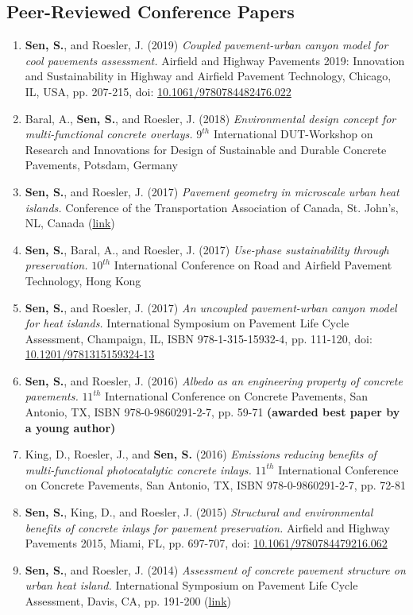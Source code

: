 \documentclass[12pt]{article}
\begin{document}
\subsection*{Peer-Reviewed Conference Papers}
\begin{enumerate}[label=(C\arabic*)]
	\item \textbf{Sen, S.}, and Roesler, J. (2019) \textit{Coupled pavement-urban canyon model for cool pavements assessment.} Airfield and Highway Pavements 2019: Innovation and Sustainability in Highway and Airfield Pavement Technology, Chicago, IL, USA, pp. 207-215, doi: \href{http://dx.doi.org/10.1061/9780784482476.022}{10.1061/9780784482476.022}
	\item Baral, A., \textbf{Sen, S.}, and Roesler, J. (2018) \textit{Environmental design concept for multi-functional concrete overlays.} $9^{th}$ International DUT-Workshop on Research and Innovations for Design of Sustainable and Durable Concrete Pavements, Potsdam, Germany
	\item \textbf{Sen, S.}, and Roesler, J. (2017) \textit{Pavement geometry in microscale urban heat islands.} Conference of the Transportation Association of Canada, St. John’s, NL, Canada (\href{http://www.tac-atc.ca/sites/default/files/conf_papers/sens_-_pavement_geometry_in_microscale_urban_heat_islands.pdf}{link})
	\item \textbf{Sen, S.}, Baral, A., and Roesler, J. (2017) \textit{Use-phase sustainability through preservation.} $10^{th}$ International Conference on Road and Airfield Pavement Technology, Hong Kong
	\item \textbf{Sen, S.}, and Roesler, J. (2017) \textit{An uncoupled pavement-urban canyon model for heat islands.} International Symposium on Pavement Life Cycle Assessment, Champaign, IL, ISBN 978-1-315-15932-4, pp. 111-120, doi: \href{http://dx.doi.org/10.1201/9781315159324-13}{10.1201/9781315159324-13}
	\item \textbf{Sen, S.}, and Roesler, J. (2016) \textit{Albedo as an engineering property of concrete pavements.} $11^{th}$ International Conference on Concrete Pavements, San Antonio, TX, ISBN 978-0-9860291-2-7, pp. 59-71 \textbf{(awarded best paper by a young author)}
	\item King, D., Roesler, J., and \textbf{Sen, S.} (2016) \textit{Emissions reducing benefits of multi-functional photocatalytic concrete inlays.} $11^{th}$ International Conference on Concrete Pavements, San Antonio, TX, ISBN 978-0-9860291-2-7, pp. 72-81
	\item \textbf{Sen, S.}, King, D., and Roesler, J. (2015) \textit{Structural and environmental benefits of concrete inlays for pavement preservation.} Airfield and Highway Pavements 2015, Miami, FL, pp. 697-707, doi: \href{http://dx.doi.org/10.1061/9780784479216.062}{10.1061/9780784479216.062}
	\item \textbf{Sen, S.}, and Roesler, J. (2014) \textit{Assessment of concrete pavement structure on urban heat island.} International Symposium on Pavement Life Cycle Assessment, Davis, CA, pp. 191-200 (\href{http://www.ucprc.ucdavis.edu/p-LCA2014/media/pdf/Papers/LCA14_Urban\%20Heat\%20Island.pdf}{link})
\end{enumerate}
\end{document}
